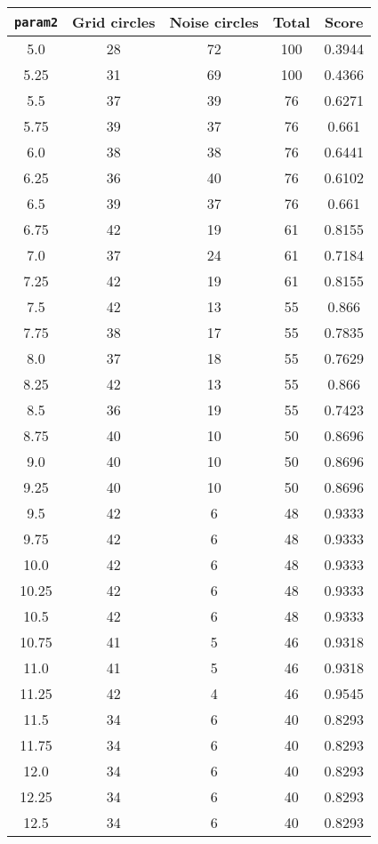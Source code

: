 \documentclass[letterpaper, 12pt]{article}
\begin{document}
\begin{longtable}{|c|c|c|c|c|}
\hline
\textbf{\texttt{param2}} & \textbf{Grid circles} & \textbf{Noise circles} & \textbf{Total} & \textbf{Score} \\
\hline
5.0 & 28 & 72 & 100 & 0.3944 \\
\hline
5.25 & 31 & 69 & 100 & 0.4366 \\
\hline
5.5 & 37 & 39 & 76 & 0.6271 \\
\hline
5.75 & 39 & 37 & 76 & 0.661 \\
\hline
6.0 & 38 & 38 & 76 & 0.6441 \\
\hline
6.25 & 36 & 40 & 76 & 0.6102 \\
\hline
6.5 & 39 & 37 & 76 & 0.661 \\
\hline
6.75 & 42 & 19 & 61 & 0.8155 \\
\hline
7.0 & 37 & 24 & 61 & 0.7184 \\
\hline
7.25 & 42 & 19 & 61 & 0.8155 \\
\hline
7.5 & 42 & 13 & 55 & 0.866 \\
\hline
7.75 & 38 & 17 & 55 & 0.7835 \\
\hline
8.0 & 37 & 18 & 55 & 0.7629 \\
\hline
8.25 & 42 & 13 & 55 & 0.866 \\
\hline
8.5 & 36 & 19 & 55 & 0.7423 \\
\hline
8.75 & 40 & 10 & 50 & 0.8696 \\
\hline
9.0 & 40 & 10 & 50 & 0.8696 \\
\hline
9.25 & 40 & 10 & 50 & 0.8696 \\
\hline
9.5 & 42 & 6 & 48 & 0.9333 \\
\hline
9.75 & 42 & 6 & 48 & 0.9333 \\
\hline
10.0 & 42 & 6 & 48 & 0.9333 \\
\hline
10.25 & 42 & 6 & 48 & 0.9333 \\
\hline
10.5 & 42 & 6 & 48 & 0.9333 \\
\hline
10.75 & 41 & 5 & 46 & 0.9318 \\
\hline
11.0 & 41 & 5 & 46 & 0.9318 \\
\hline
11.25 & 42 & 4 & 46 & 0.9545 \\
\hline
11.5 & 34 & 6 & 40 & 0.8293 \\
\hline
11.75 & 34 & 6 & 40 & 0.8293 \\
\hline
12.0 & 34 & 6 & 40 & 0.8293 \\
\hline
12.25 & 34 & 6 & 40 & 0.8293 \\
\hline
12.5 & 34 & 6 & 40 & 0.8293 \\

\end{longtable}
\end{document}
